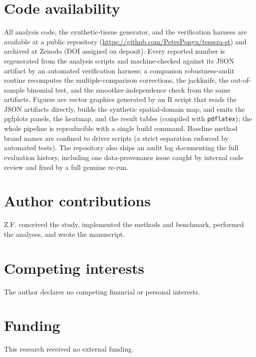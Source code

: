 \documentclass[journal]{IEEEtran}
\begin{document}
\section*{Code availability}
All analysis code, the synthetic-tissue generator, and the verification harness are available at a public
repository (\url{https://github.com/PeterPonyu/tessera-st}) and archived at Zenodo (DOI assigned on
deposit). Every reported number is regenerated from the analysis scripts and machine-checked against its
JSON artifact by an automated verification harness; a companion robustness-audit routine recomputes the
multiple-comparison corrections, the jackknife, the out-of-sample binomial test, and the
smoother-independence check from the same artifacts. Figures are vector graphics generated by an R script
that reads the JSON artifacts directly, builds the synthetic spatial-domain map, and emits the pgfplots
panels, the heatmap, and the result tables (compiled with \texttt{pdflatex}); the whole pipeline is
reproducible with a single build command. Baseline method brand names are confined to driver scripts (a
strict separation enforced by automated tests). The repository also ships an audit log documenting the
full evaluation history, including one data-provenance issue caught by internal code review and fixed by a
full genuine re-run.

\section*{Author contributions}
Z.F. conceived the study, implemented the methods and benchmark, performed the analyses, and wrote the
manuscript.

\section*{Competing interests}
The author declares no competing financial or personal interests.

\section*{Funding}
This research received no external funding.



\end{document}
